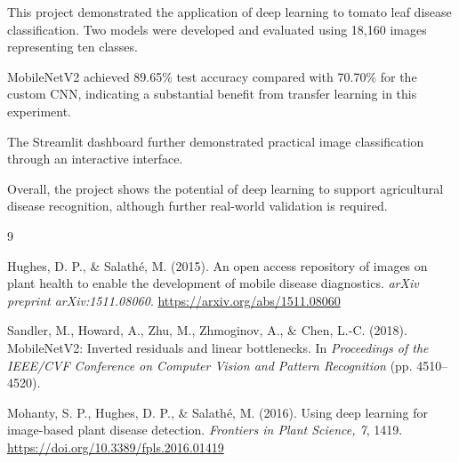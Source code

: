 \documentclass[12pt,a4paper]{article}
\begin{document}
This project demonstrated the application of deep learning to tomato leaf disease classification. Two models were developed and evaluated using 18,160 images representing ten classes.

MobileNetV2 achieved 89.65\% test accuracy compared with 70.70\% for the custom CNN, indicating a substantial benefit from transfer learning in this experiment.

The Streamlit dashboard further demonstrated practical image classification through an interactive interface.

Overall, the project shows the potential of deep learning to support agricultural disease recognition, although further real-world validation is required.

\begin{thebibliography}{9}

Hughes, D. P., \& Salathé, M. (2015).
An open access repository of images on plant health to enable the development of mobile disease diagnostics.
\textit{arXiv preprint arXiv:1511.08060}.
\url{https://arxiv.org/abs/1511.08060}

Sandler, M., Howard, A., Zhu, M., Zhmoginov, A., \& Chen, L.-C. (2018).
MobileNetV2: Inverted residuals and linear bottlenecks.
In \textit{Proceedings of the IEEE/CVF Conference on Computer Vision and Pattern Recognition} (pp. 4510--4520).

Mohanty, S. P., Hughes, D. P., \& Salathé, M. (2016).
Using deep learning for image-based plant disease detection.
\textit{Frontiers in Plant Science, 7}, 1419.
\url{https://doi.org/10.3389/fpls.2016.01419}

\end{thebibliography}
\end{document}
